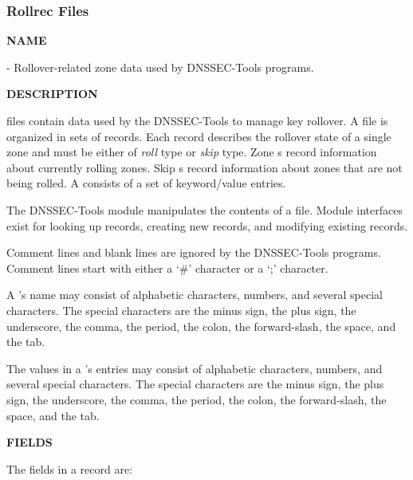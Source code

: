 \clearpage

\subsubsection{Rollrec Files}

{\bf NAME}

 - Rollover-related zone data used by DNSSEC-Tools programs.

{\bf DESCRIPTION}

 files contain data used by the DNSSEC-Tools to manage key
rollover.  A  file is organized in sets of 
records.  Each  record describes the rollover state of a
single zone and must be either of {\it roll} type or {\it skip} type.  Zone
s record information about currently rolling zones.  Skip
s record information about zones that are not being rolled.
A  consists of a set of keyword/value entries.

The DNSSEC-Tools  module manipulates the contents of
a  file.  Module interfaces exist for looking up
 records, creating new records, and modifying existing
records.

Comment lines and blank lines are ignored by the DNSSEC-Tools programs.
Comment lines start with either a `\#' character or a `;' character.

A 's name may consist of alphabetic characters, numbers, and
several special characters.  The special characters are the minus sign, the
plus sign, the underscore, the comma, the period, the colon, the
forward-slash, the space, and the tab.

The values in a 's entries may consist of alphabetic
characters, numbers, and several special characters.  The special characters
are the minus sign, the plus sign, the underscore, the comma, the period, the
colon, the forward-slash, the space, and the tab.

{\bf FIELDS}

The fields in a  record are:

